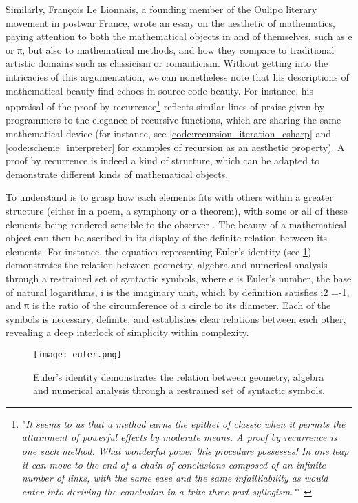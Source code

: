 Similarly, François Le Lionnais, a founding member of the Oulipo literary movement in postwar France, wrote an essay on the aesthetic of mathematics, paying attention to both the mathematical objects in and of themselves, such as e or π, but also to mathematical methods, and how they compare to traditional artistic domains such as classicism or romanticism. Without getting into the intricacies of this argumentation, we can nonetheless note that his descriptions of mathematical beauty find echoes in source code beauty. For instance, his appraisal of the proof by recurrence\footnote{"\emph{It seems to us that a method earns the epithet of classic when it permits the attainment of powerful effects by moderate means. A proof by recurrence is one such method. What wonderful power this procedure possesses! In one leap it can move to the end of a chain of conclusions composed of an infinite number of links, with the same ease and the same infailliability as would enter into deriving the conclusion in a trite three-part syllogism."}" \citep{lelionnais_great_1971}} reflects similar lines of praise given by programmers to the elegance of recursive functions, which are sharing the same mathematical device (for instance, see \ref{code:recursion_iteration_csharp} and \ref{code:scheme_interpreter} for examples of recursion as an aesthetic property). A proof by recurrence is indeed a kind of structure, which can be adapted to demonstrate different kinds of mathematical objects.

To understand is to grasp how each elements fits with others within a greater structure (either in a poem, a symphony or a theorem), with some or all of these elements being rendered sensible to the observer \citep{cellucci_mathematical_2015}. The beauty of a mathematical object can then be ascribed in its display of the definite relation between its elements. For instance, the equation representing Euler's identity (see \ref{graphic:euler}) demonstrates the relation between geometry, algebra and numerical analysis through a restrained set of syntactic symbols, where e is Euler's number, the base of natural logarithms, i is the imaginary unit, which by definition satisfies i\^{2} =-1, and π is the ratio of the circumference of a circle to its diameter. Each of the symbols is necessary, definite, and establishes clear relations between each other, revealing a deep interlock of simplicity within complexity.

\begin{figure}
    \texttt{[image: euler.png]}
    \caption{Euler's identity demonstrates the relation between geometry, algebra and numerical analysis through a restrained set of syntactic symbols.}
    \label{graphic:euler}
\end{figure}

